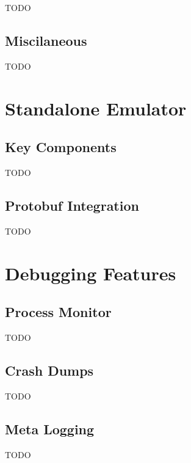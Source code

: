 TODO

\subsection{Miscilaneous}

TODO


\section{Standalone Emulator}

\subsection{Key Components}

TODO

\subsection{Protobuf Integration}

TODO


\section{Debugging Features}

\subsection{Process Monitor}

TODO

\subsection{Crash Dumps}

TODO

\subsection{Meta Logging}

TODO
